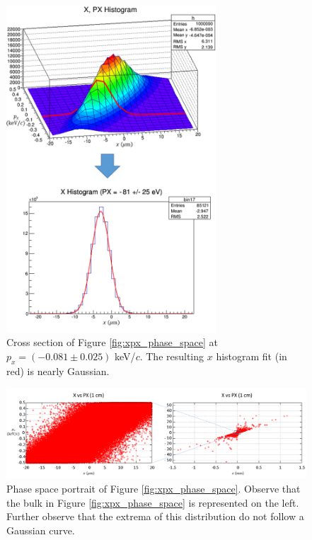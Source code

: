 \begin{figure}[H]
  \centering
    \includegraphics[width=0.7\textwidth]{Figures/xpx_phase_space_cut} 
  \caption[Cross section of Figure \ref{fig:xpx_phase_space} at $p_x=0.08$ keV/$c$.]{Cross section of Figure \ref{fig:xpx_phase_space} at $p_x=(-0.081 \pm 0.025)$ keV/$c$. The resulting $x$ histogram fit (in red) is nearly Gaussian.}
  \label{fig:xpx_phase_space_cut}
\end{figure}

\begin{figure}[H]
  \centering
    \includegraphics[width=\textwidth]{Figures/phase_space_portrait} 
  \caption[Phase space portrait of Figure \ref{fig:xpx_phase_space}.]{Phase space portrait of Figure \ref{fig:xpx_phase_space}. Observe that the bulk in Figure \ref{fig:xpx_phase_space} is represented on the left. Further observe that the extrema of this distribution do not follow a Gaussian curve.}
  \label{fig:phase_space_portrait}
\end{figure}

